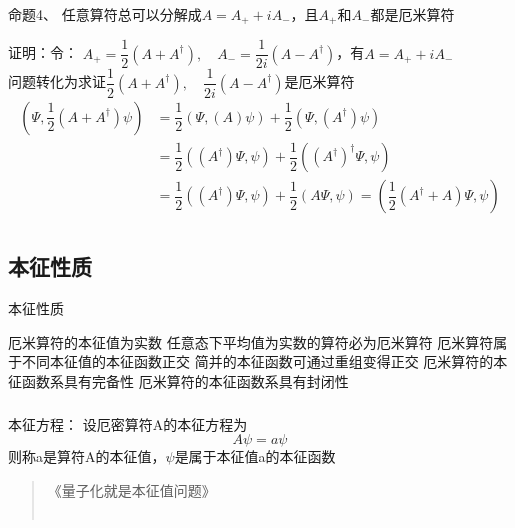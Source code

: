 \begin{frame} [allowframebreaks=]
    \frametitle{}
    \begin{tcolorbox1}{命题4、}
       任意算符总可以分解成$A=A_+ +iA_-$，且$A_+$和$A_-$都是厄米算符
    \end{tcolorbox1}
    \alert{证明：}令：
    $A_+=\dfrac{1}{2} (A+A^\dagger), \quad A_-=\dfrac{1}{2i} (A-A^\dagger) $，有$A=A_+ +iA_-$\\
    问题转化为求证$\dfrac{1}{2} (A+A^\dagger), \quad \dfrac{1}{2i} (A-A^\dagger) $是厄米算符\\
    \begin{equation*}
        \begin{split}
            (\Psi, \dfrac{1}{2} (A+A^\dagger)\psi ) &=\dfrac{1}{2}(\Psi, (A)\psi) + \dfrac{1}{2}(\Psi, (A^\dagger)\psi) \\
            &= \dfrac{1}{2}((A^\dagger)\Psi, \psi) + \dfrac{1}{2}((A^\dagger)^\dagger\Psi, \psi) \\
            &= \dfrac{1}{2}((A^\dagger)\Psi, \psi) + \dfrac{1}{2}(A\Psi, \psi)= ( \dfrac{1}{2}(A^\dagger + A) \Psi, \psi ) \\
         \end{split}
    \end{equation*}  
\end{frame} 

\subsection{本征性质}

\begin{frame}{本征性质}
    \begin{enumerate}
        \Item 厄米算符的本征值为实数
        \Item 任意态下平均值为实数的算符必为厄米算符
        \Item 厄米算符属于不同本征值的本征函数正交
        \Item 简并的本征函数可通过重组变得正交
        \Item 厄米算符的本征函数系具有完备性
        \Item 厄米算符的本征函数系具有封闭性
    \end{enumerate}
\end{frame} 

\begin{frame}
    \frametitle{}
    \begin{tcolorbox1}{本征方程：}
        设厄密算符A的本征方程为
        $$ A\psi=a \psi $$
        则称a是算符A的本征值，$\psi$是属于本征值a的本征函数
     \end{tcolorbox1}   
     \begin{quote}
        《量子化就是本征值问题》\\
        ~~\\
     \end{quote}
\end{frame} 

